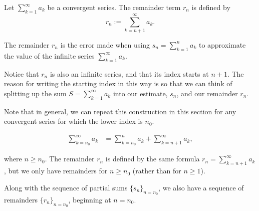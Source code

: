 \documentclass{ximera}
\begin{document}
\begin{definition}
Let $ \sum_{k=1}^\infty a_k$ be a convergent series.  The remainder term $r_n$ is defined by
\[
r_n := \sum \limits_{k=n+1}^{\infty} a_k.
\]

The remainder $r_n$ is the error made when using $s_n = \sum_{k=1}^n a_k$ to approximate the value of the infinite series $ \sum_{k=1}^\infty a_k$.
\end{definition}

Notice that $r_n$ is also an infinite series, and that its index starts at $n+1$.  The reason for writing the starting index in this way is so that we can think of splitting up the sum $S = \sum \limits_{k=1}^\infty a_k$ into our estimate, $s_n$, and our remainder $r_n$.

\begin{image}
  \end{image} %

\begin{remark}
Note that in general, we can repeat this construction in this section for any convergent series for which the lower index is $n_0$.

\begin{align*}
\sum_{k=n_0}^\infty a_k &= \sum_{k=n_0}^n a_k+\sum_{k=n+1}^\infty a_k,
\end{align*}

where $n \geq n_0$.  The remainder $r_n$ is defined by the same formula $r_n = \sum_{k=n+1}^{\infty} a_k$, but we only have remainders for $n \geq n_0$ (rather than for $n \geq 1$).  

Along with the sequence of partial sums $\{s_n\}_{n = n_0}$, we also have a sequence of remainders $\{r_n\}_{n=n_0}$, beginning at $n=n_0$.  

\end{remark}
\end{document}
